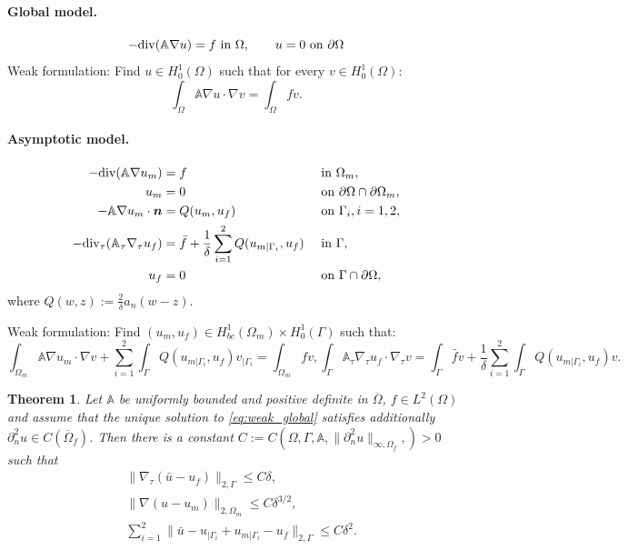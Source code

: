 \documentclass[a4paper]{article}
\newtheorem{theorem}{Theorem}
\def\vc#1{\mathbf{\boldsymbol{#1}}}     %
\def\tn#1{{\mathbb{#1}}}    %
\def\div{{\rm div}}
\def\norm#1{\|#1\|}
\begin{document}
\paragraph{Global model.}
\[
-\div(\tn A\nabla u) = f \mbox{ in }\Omega,\qquad
u=0\mbox{ on }\partial\Omega
\]
Weak formulation: Find $u\in H^1_0(\Omega)$ such that for every $v\in H^1_0(\Omega)$:
\begin{equation}
\label{eq:weak_global}
\int_\Omega \tn A\nabla u\cdot\nabla v = \int_\Omega fv.
\end{equation}

\paragraph{Asymptotic model.}
\begin{align*}
-\div(\tn A\nabla u_m) &= f &&\mbox{ in }\Omega_m,\\
u_m &= 0 &&\mbox{ on }\partial\Omega\cap\partial\Omega_m,\\
-\tn A\nabla u_m\cdot\vc n &= Q(u_m,u_f) &&\mbox{ on }\Gamma_i,i=1,2,\\
-\div_\tau(\tn A_\tau\nabla_\tau u_f) &= \bar f + \frac1\delta\sum_{i=1}^2 Q(u_{m|\Gamma_i},u_f) &&\mbox{ in }\Gamma,\\
u_f &= 0 &&\mbox{ on }\Gamma\cap\partial\Omega,
\end{align*}
where $Q(w,z):=\frac2\delta a_n(w-z)$.

Weak formulation: Find $(u_m,u_f)\in H^1_{bc}(\Omega_m)\times H^1_0(\Gamma)$ such that:
\begin{subequations}
\label{eq:weak_asym}
\begin{equation}
\int_{\Omega_m}\tn A\nabla u_m\cdot\nabla v + \sum_{i=1}^2\int_\Gamma Q(u_{m|\Gamma_i},u_f)v_{|\Gamma_i} = \int_{\Omega_m} fv,
\end{equation}
\begin{equation}
\int_{\Gamma}\tn A_\tau\nabla_\tau u_f\cdot\nabla_\tau v = \int_\Gamma\bar f v + \frac1\delta\sum_{i=1}^2\int_\Gamma Q(u_{m|\Gamma_i},u_f)v.
\end{equation}
\end{subequations}


\begin{theorem}
Let $\tn A$ be uniformly bounded and positive definite in $\overline\Omega$, $f\in L^2(\Omega)$ and assume that the unique solution to \eqref{eq:weak_global} satisfies additionally $\partial_n^2 u\in C(\overline\Omega_f)$.
Then there is a constant $C:=C(\Omega,\Gamma,\tn A,\norm{\partial_n^2 u}_{\infty,\Omega_f},)>0$ such that
\begin{subequations}
\label{eq:error_estimates_delta}
\begin{align}
&\norm{\nabla_\tau(\bar u- u_f)}_{2,\Gamma} \le C\delta,\\
&\norm{\nabla(u-u_m)}_{2,\Omega_m} \le C\delta^{3/2},\\
&\sum_{i=1}^2\norm{\bar u-u_{|\Gamma_i}+u_{m|\Gamma_i}-u_f}_{2,\Gamma} \le C\delta^2.
\end{align}
\end{subequations}
\end{theorem}
\end{document}
